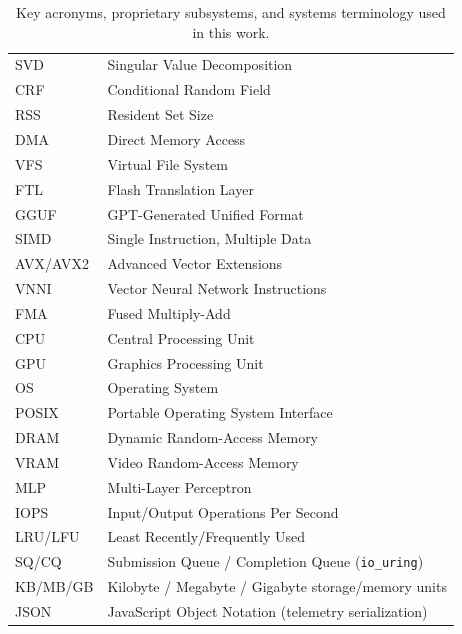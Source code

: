 \begin{table}[t]
\begin{tabular}{lp{}}
SVD & Singular Value Decomposition \\
CRF & Conditional Random Field \\
RSS & Resident Set Size \\
DMA & Direct Memory Access \\
VFS & Virtual File System \\
FTL & Flash Translation Layer \\
GGUF & GPT-Generated Unified Format \\
SIMD & Single Instruction, Multiple Data \\
AVX/AVX2 & Advanced Vector Extensions \\
VNNI & Vector Neural Network Instructions \\
FMA & Fused Multiply-Add \\
CPU & Central Processing Unit \\
GPU & Graphics Processing Unit \\
OS & Operating System \\
POSIX & Portable Operating System Interface \\
DRAM & Dynamic Random-Access Memory \\
VRAM & Video Random-Access Memory \\
MLP & Multi-Layer Perceptron \\
IOPS & Input/Output Operations Per Second \\
LRU/LFU & Least Recently/Frequently Used \\
SQ/CQ & Submission Queue / Completion Queue (\texttt{io\_uring}) \\
KB/MB/GB & Kilobyte / Megabyte / Gigabyte storage/memory units \\
JSON & JavaScript Object Notation (telemetry serialization) \\
\bottomrule
\end{tabular}
\caption{Key acronyms, proprietary subsystems, and systems terminology used in this work.}
\end{table}
